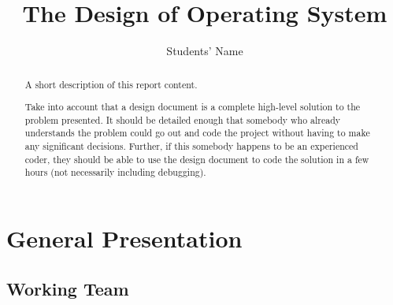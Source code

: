 \documentclass[a4paper,12pt]{report}
\title{The Design of \OSName{} Operating System}
\author{Students' Name}
\begin{document}


\maketitle

\begin{abstract}
	A short description of this report content. 
	
	Take into account that a design document is a complete high-level solution to the problem presented. It should be detailed enough that somebody who already understands the problem could go out and code the project without having to make any significant decisions. Further, if this somebody happens to be an experienced coder, they should be able to use the design document to code the solution in a few hours (not necessarily including debugging). 
\end{abstract}


\chapter{General Presentation}

\section{Working Team}
\end{document}
